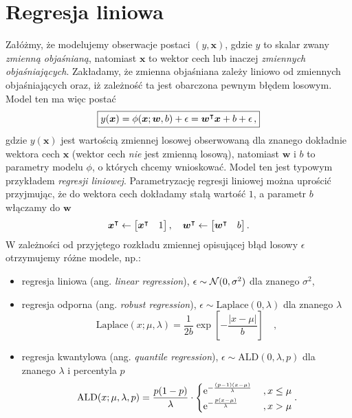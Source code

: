 \documentclass{myclass}
\begin{document}
\section{Regresja liniowa}

Załóżmy, że modelujemy obserwacje postaci \((y, \bm{x})\), gdzie \(y\) to skalar zwany \emph{zmienną
objaśnianą}, natomiast \(\bm{x}\) to wektor cech lub inaczej \emph{zmiennych objaśniających}.
Zakładamy, że zmienna objaśniana zależy liniowo od zmiennych objaśniających oraz, iż zależność ta
jest obarczona pewnym błędem losowym. Model ten ma więc postać
\[
\boxed{
    y(\bm{x}) = \phi(\bm{x}; \bm{w}, b) + \epsilon = \bm{w}^\intercal \bm{x} + b + \epsilon\,,
}
\]
gdzie \(y(\bm{x})\) jest wartością zmiennej losowej obserwowaną dla znanego dokładnie wektora cech
\(\bm{x}\) (wektor cech \emph{nie} jest zmienną losową), natomiast \(\bm{w}\) i \(b\) to parametry
modelu \(\phi\), o których chcemy wnioskować. Model ten jest typowym przykładem \emph{regresji
liniowej}. Parametryzację regresji liniowej można uprościć przyjmując, że do wektora cech dokładamy
stałą wartość \(1\), a parametr \(b\) włączamy do \(\bm{w}\)
\[
    \bm{x}^\tpose \gets \mqty[\bm{x}^\tpose & 1]\,,\quad \bm{w}^\tpose \gets \mqty[\bm{w}^\tpose & b] \,.
\]
W zależności od przyjętego rozkładu zmiennej opisującej błąd losowy \(\epsilon\) otrzymujemy różne
modele, np.:
\begin{itemize}
    \item regresja liniowa (ang. \emph{linear regression}), \(\epsilon \sim \mathcal{N}(0, \sigma^2)\)
    dla znanego \(\sigma^2\),

    \item regresja odporna (ang. \emph{robust regression}), \(\epsilon \sim \text{Laplace}(0,
    \lambda)\) dla znanego \(\lambda\)
    \[
        \text{Laplace}(x; \mu, \lambda) = \frac{1}{2b} \exp\left[- \frac{|x - \mu|}{b}\right]\quad,
    \]
    \item regresja kwantylowa (ang. \emph{quantile regression}), \(\epsilon \sim \text{ALD}(0,
    \lambda, p)\) dla znanego \(\lambda\) i percentyla \(p\)
    \[
        \text{ALD}(x; \mu, \lambda, p) = \frac{p(1-p)}{\lambda} \cdot \begin{cases}
                \displaystyle \mathrm{e}^{-\frac{(p-1)(x-\mu)}{\lambda}} &\,, x \leq \mu\\
                \displaystyle \mathrm{e}^{-\frac{p (x - \mu)}{\lambda}}  &\,, x > \mu
        \end{cases}.
    \]  
\end{itemize}
\end{document}
